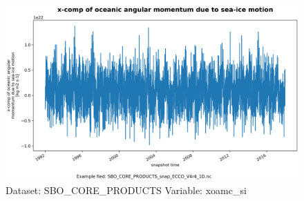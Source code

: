 \begin{figure}[H]
\centering
\includegraphics[scale=0.55]{../images/plots/oneD_plots/SBO_Core_Products/xoamc_si.png}
\caption{Dataset: SBO\_CORE\_PRODUCTS Variable: xoamc\_si}
\label{tab:table-SBO_CORE_PRODUCTS_xoamc_si-Plot}
\end{figure}
\pagebreak
